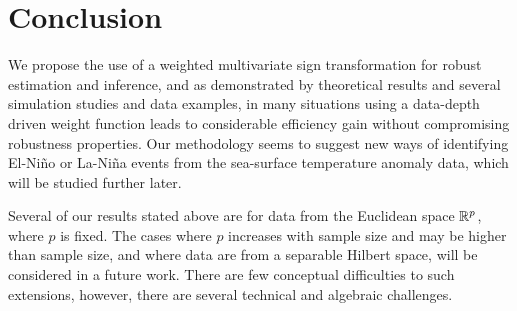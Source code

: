 \section{Conclusion}
\label{Sec:Conclusion}
We propose the use of a weighted multivariate sign transformation for robust 
estimation and inference, and as demonstrated by theoretical results and several 
simulation studies and data examples, in many situations using a data-depth driven weight 
function leads to considerable efficiency gain without compromising robustness 
properties. Our methodology seems to suggest new ways of identifying 
El-Ni\~no or La-Ni\~na events from the sea-surface temperature anomaly data, 
which will be studied further later.

Several of our results stated above are for data from the Euclidean space ${\mathbb{R}}^{p}$, where 
$p$ is fixed. The cases where $p$ increases with sample size and may be higher than sample 
size, and where data are from a separable Hilbert space, will be considered in a future 
work. There are few conceptual difficulties to such extensions, however, there are 
several technical and algebraic challenges. 

